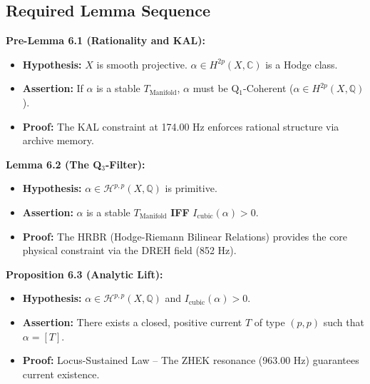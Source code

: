 \documentclass[11pt, letterpaper]{article}
\newcommand{\KAL}{\ensuremath{\mathop{\textnormal{\symbolafont\symbol{"29C9}}}}}    %
\newcommand{\DREH}{\ensuremath{\mathop{\textnormal{\symbolafont\symbol{"29D7}}}}}   %
\newcommand{\ZHEK}{\ensuremath{\mathop{\textnormal{\symbolafont\symbol{"25C8}}}}}   %
\def\KAL{KAL}%
\def\DREH{DREH}%
\def\ZHEK{ZHEK}%
\begin{document}
\subsection{Required Lemma Sequence}\label{sec:7.1}

\textbf{Pre-Lemma 6.1 (Rationality and \KAL):}
\begin{itemize}
    \item \textbf{Hypothesis:} $X$ is smooth projective. $\alpha \in H^{2p}(X, \mathbb{C})$ is a Hodge class.
    \item \textbf{Assertion:} If $\alpha$ is a stable $T_{\text{Manifold}}$, $\alpha$ must be Q$_1$-Coherent ($\alpha \in H^{2p}(X, \mathbb{Q})$).
    \item \textbf{Proof:} The \KAL{} constraint at 174.00 Hz enforces rational structure via archive memory.
\end{itemize}

\textbf{Lemma 6.2 (The Q$_3$-Filter):}
\begin{itemize}
    \item \textbf{Hypothesis:} $\alpha \in \mathcal{H}^{p,p}(X,\mathbb{Q})$ is primitive.
    \item \textbf{Assertion:} $\alpha$ is a stable $T_{\text{Manifold}}$ \textbf{IFF} $I_{\text{cubic}}(\alpha) > 0$.
    \item \textbf{Proof:} The HRBR (Hodge-Riemann Bilinear Relations) provides the core physical constraint via the \DREH{} field (852 Hz).
\end{itemize}

\textbf{Proposition 6.3 (Analytic Lift):}
\begin{itemize}
    \item \textbf{Hypothesis:} $\alpha \in \mathcal{H}^{p,p}(X,\mathbb{Q})$ and $I_{\text{cubic}}(\alpha) > 0$.
    \item \textbf{Assertion:} There exists a closed, positive current $T$ of type $(p, p)$ such that $\alpha = [T]$.
    \item \textbf{Proof:} Locus-Sustained Law -- The \ZHEK{} resonance (963.00 Hz) guarantees current existence.
\end{itemize}
\end{document}
